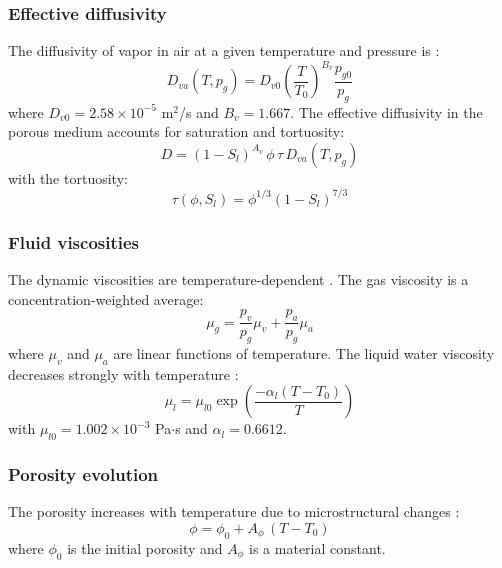 \subsubsection{Effective diffusivity}

The diffusivity of vapor in air at a given temperature and pressure is \cite{dauti2018}:
\begin{equation}
    D_{va}(T, p_g) = D_{v0} \left(\frac{T}{T_0}\right)^{B_v} \frac{p_{g0}}{p_g}
    \label{eq:Dva}
\end{equation}
where $D_{v0} = 2.58 \times 10^{-5}$ m$^2$/s and $B_v = 1.667$. The effective diffusivity in the porous medium accounts for saturation and tortuosity:
\begin{equation}
    D = (1-S_l)^{A_v}\,\phi\,\tau\, D_{va}(T, p_g) \label{eq:D_eff}
\end{equation}
with the tortuosity:
\begin{equation}
    \tau(\phi, S_l) = \phi^{1/3}(1-S_l)^{7/3} \label{eq:tortuosity}
\end{equation}

\subsubsection{Fluid viscosities}
The dynamic viscosities are temperature-dependent \cite{dauti2018}. The gas viscosity is a concentration-weighted average:
\begin{equation}
    \mu_g = \frac{p_v}{p_g}\mu_v + 
    \frac{p_a}{p_g}\mu_a
\end{equation}
where $\mu_v$ and $\mu_a$ are linear functions of temperature. The liquid water viscosity decreases strongly with temperature \cite{dauti2018}:
\begin{equation}
    \mu_l = \mu_{l0}\exp
    \left(\frac{-\alpha_l(T-T_0)}{T}\right)
\end{equation}
with $\mu_{l0} = 1.002 \times 10^{-3}$ Pa$\cdot$s and $\alpha_l = 0.6612$.

\subsubsection{Porosity evolution}

The porosity increases with temperature due to microstructural changes \cite{dauti2018}:
\begin{equation}
    \phi = \phi_0 + A_\phi\,(T - T_0) \label{eq:porosity}
\end{equation}
where $\phi_0$ is the initial porosity and $A_\phi$ is a material constant.

